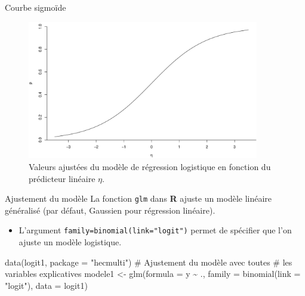 \documentclass[
  ignorenonframetext,
]{beamer}
\newenvironment{Shaded}{\begin{snugshade}}{\end{snugshade}}
\newcommand{\AttributeTok}[1]{\textcolor[rgb]{0.40,0.45,0.13}{#1}}
\newcommand{\CommentTok}[1]{\textcolor[rgb]{0.37,0.37,0.37}{#1}}
\newcommand{\FunctionTok}[1]{\textcolor[rgb]{0.28,0.35,0.67}{#1}}
\newcommand{\NormalTok}[1]{\textcolor[rgb]{0.00,0.23,0.31}{#1}}
\newcommand{\OtherTok}[1]{\textcolor[rgb]{0.00,0.23,0.31}{#1}}
\newcommand{\SpecialCharTok}[1]{\textcolor[rgb]{0.37,0.37,0.37}{#1}}
\newcommand{\StringTok}[1]{\textcolor[rgb]{0.13,0.47,0.30}{#1}}
\providecommand{\tightlist}{%
  \setlength{\itemsep}{0pt}\setlength{\parskip}{0pt}}\usepackage{longtable,booktabs,array}
\begin{document}
\begin{frame}{Courbe sigmoïde}
\protect\hypertarget{courbe-sigmouxefde}{}
\begin{figure}

{\centering \includegraphics[width=0.9\textwidth,height=\textheight]{MATH60602-diapos5_files/figure-beamer/fig-logitplot-1.pdf}

}

\caption{\label{fig-logitplot}Valeurs ajustées du modèle de régression
logistique en fonction du prédicteur linéaire \(\eta\).}

\end{figure}
\end{frame}

\begin{frame}[fragile]{Ajustement du modèle}
\protect\hypertarget{ajustement-du-moduxe8le}{}
La fonction \texttt{glm} dans \textbf{R} ajuste un modèle linéaire
généralisé (par défaut, Gaussien pour régression linéaire).

\begin{itemize}
\tightlist
\item
  L'argument \texttt{family=binomial(link="logit")} permet de spécifier
  que l'on ajuste un modèle logistique.
\end{itemize}

\begin{Shaded}
\begin{Highlighting}[numbers=left,,]
\FunctionTok{data}\NormalTok{(logit1, }\AttributeTok{package =} \StringTok{"hecmulti"}\NormalTok{)}
\CommentTok{\# Ajustement du modèle avec toutes}
\CommentTok{\# les variables explicatives}
\NormalTok{modele1 }\OtherTok{\textless{}{-}} \FunctionTok{glm}\NormalTok{(}\AttributeTok{formula =}\NormalTok{ y }\SpecialCharTok{\textasciitilde{}}\NormalTok{ .,}
            \AttributeTok{family =} \FunctionTok{binomial}\NormalTok{(}\AttributeTok{link =} \StringTok{"logit"}\NormalTok{),}
            \AttributeTok{data =}\NormalTok{ logit1)}
\end{Highlighting}
\end{Shaded}
\end{frame}
\end{document}
